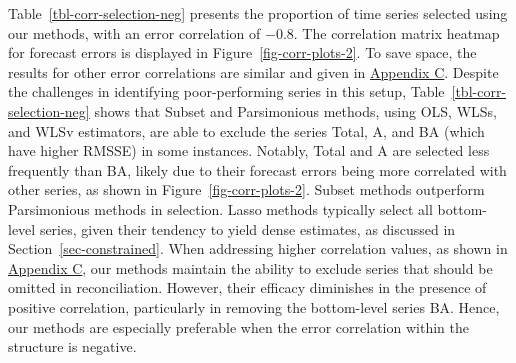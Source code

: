 \documentclass[
  11pt]{article}
\theoremstyle{plain}
\theoremstyle{remark}
\begin{document}
Table~\ref{tbl-corr-selection-neg} presents the proportion of time
series selected using our methods, with an error correlation of
\(-0.8\). The correlation matrix heatmap for forecast errors is
displayed in Figure~\ref{fig-corr-plots-2}. To save space, the results
for other error correlations are similar and given in
\hyperref[appendix-sim2]{Appendix C}. Despite the challenges in
identifying poor-performing series in this setup,
Table~\ref{tbl-corr-selection-neg} shows that Subset and Parsimonious
methods, using OLS, WLSs, and WLSv estimators, are able to exclude the
series Total, A, and BA (which have higher RMSSE) in some instances.
Notably, Total and A are selected less frequently than BA, likely due to
their forecast errors being more correlated with other series, as shown
in Figure~\ref{fig-corr-plots-2}. Subset methods outperform Parsimonious
methods in selection. Lasso methods typically select all bottom-level
series, given their tendency to yield dense estimates, as discussed in
Section~\ref{sec-constrained}. When addressing higher correlation
values, as shown in \hyperref[appendix-sim2]{Appendix C}, our methods
maintain the ability to exclude series that should be omitted in
reconciliation. However, their efficacy diminishes in the presence of
positive correlation, particularly in removing the bottom-level series
BA. Hence, our methods are especially preferable when the error
correlation within the structure is
negative.
\end{document}
